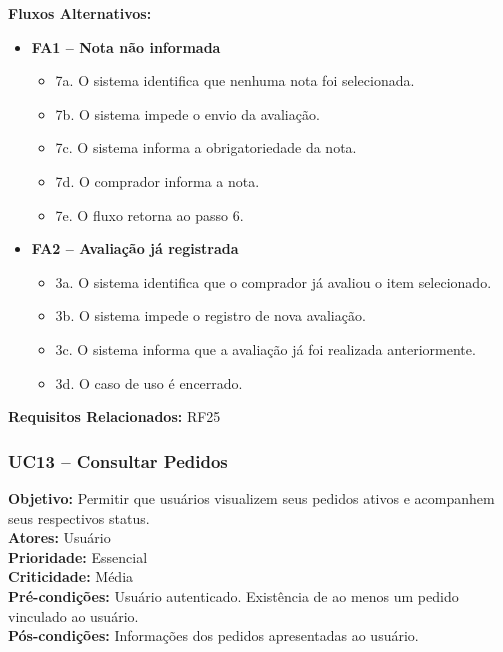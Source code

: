 ﻿\documentclass[12pt,a4paper]{article}
\begin{document}
\vspace{0.5em}
\noindent\textbf{Fluxos Alternativos:}
\begin{itemize}[leftmargin=*]
    \item \textbf{FA1 – Nota não informada}
    \begin{itemize}[label={}, leftmargin=0.5cm]
        \item 7a. O sistema identifica que nenhuma nota foi selecionada.
        \item 7b. O sistema impede o envio da avaliação.
        \item 7c. O sistema informa a obrigatoriedade da nota.
        \item 7d. O comprador informa a nota.
        \item 7e. O fluxo retorna ao passo 6.
    \end{itemize}
    
    \item \textbf{FA2 – Avaliação já registrada}
    \begin{itemize}[label={}, leftmargin=0.5cm]
        \item 3a. O sistema identifica que o comprador já avaliou o item selecionado.
        \item 3b. O sistema impede o registro de nova avaliação.
        \item 3c. O sistema informa que a avaliação já foi realizada anteriormente.
        \item 3d. O caso de uso é encerrado.
    \end{itemize}
\end{itemize}

\vspace{0.5em}
\noindent\textbf{Requisitos Relacionados:} RF25


\subsubsection{UC13 – Consultar Pedidos}
\label{uc:13}
\noindent\textbf{Objetivo:} Permitir que usuários visualizem seus pedidos ativos e acompanhem seus respectivos status.\\
\textbf{Atores:} Usuário\\
\textbf{Prioridade:} Essencial\\
\textbf{Criticidade:} Média\\
\textbf{Pré-condições:} Usuário autenticado. Existência de ao menos um pedido vinculado ao usuário.\\
\textbf{Pós-condições:} Informações dos pedidos apresentadas ao usuário.
\end{document}

